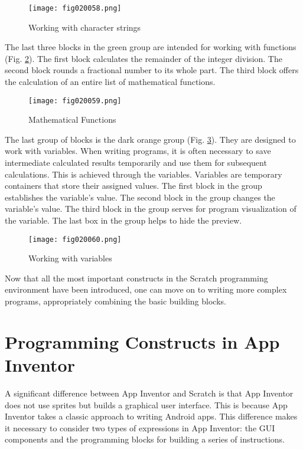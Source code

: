 \begin{figure}[H]
   \centering
   \texttt{[image: fig020058.png]}
   \caption{Working with character strings}
\label{fig020058}
\end{figure}

The last three blocks in the green group are intended for working with functions (Fig. \ref{fig020059}). The first block calculates the remainder of the integer division. The second block rounds a fractional number to its whole part. The third block offers the calculation of an entire list of mathematical functions.

\begin{figure}[H]
   \centering
   \texttt{[image: fig020059.png]}
   \caption{Mathematical Functions}
\label{fig020059}
\end{figure}

The last group of blocks is the dark orange group (Fig. \ref{fig020060}). They are designed to work with variables. When writing programs, it is often necessary to save intermediate calculated results temporarily and use them for subsequent calculations. This is achieved through the variables. Variables are temporary containers that store their assigned values. The first block in the group establishes the variable's value. The second block in the group changes the variable's value. The third block in the group serves for program visualization of the variable. The last box in the group helps to hide the preview.

\begin{figure}[H]
   \centering
   \texttt{[image: fig020060.png]}
   \caption{Working with variables}
\label{fig020060}
\end{figure}

Now that all the most important constructs in the Scratch programming environment have been introduced, one can move on to writing more complex programs, appropriately combining the basic building blocks.

\section{Programming Constructs in App Inventor}

A significant difference between App Inventor and Scratch is that App Inventor does not use sprites but builds a graphical user interface. This is because App Inventor takes a classic approach to writing Android apps. This difference makes it necessary to consider two types of expressions in App Inventor: the GUI components and the programming blocks for building a series of instructions.


